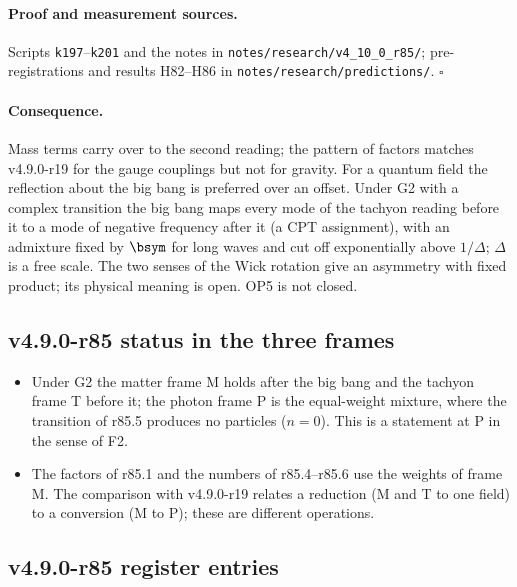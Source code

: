 \paragraph{Proof and measurement sources.}
Scripts \texttt{k197}--\texttt{k201} and the notes in \texttt{notes/\allowbreak research/\allowbreak v4\_10\_0\_r85/}; pre-registrations and results
H82--H86 in \texttt{notes/\allowbreak research/\allowbreak predictions/}.  \(\square\)

\paragraph{Consequence.}
Mass terms carry over to the second reading; the pattern of factors matches v4.9.0-r19 for the gauge couplings but not for gravity.
For a quantum field the reflection about the big bang is preferred over an offset.  Under G2 with a complex transition the big bang maps
every mode of the tachyon reading before it to a mode of negative frequency after it (a CPT assignment), with an admixture fixed by
\(\bsym\) for long waves and cut off exponentially above \(1/\Delta\); \(\Delta\) is a free scale.  The two senses of the Wick rotation give an
asymmetry with fixed product; its physical meaning is open.  OP5 is not closed.

\subsection*{v4.9.0-r85 status in the three frames}
\label{subsec:v490-r85-frames}

\begin{itemize}[leftmargin=2em]
\item Under G2 the matter frame M holds after the big bang and the tachyon frame T before it; the photon frame P is the equal-weight
mixture, where the transition of r85.5 produces no particles (\(n=0\)).  This is a statement at P in the sense of F2.
\item The factors of r85.1 and the numbers of r85.4--r85.6 use the weights of frame M.  The comparison with v4.9.0-r19 relates a reduction
(M and T to one field) to a conversion (M to P); these are different operations.
\end{itemize}

\subsection*{v4.9.0-r85 register entries}
\label{subsec:v490-r85-register}

